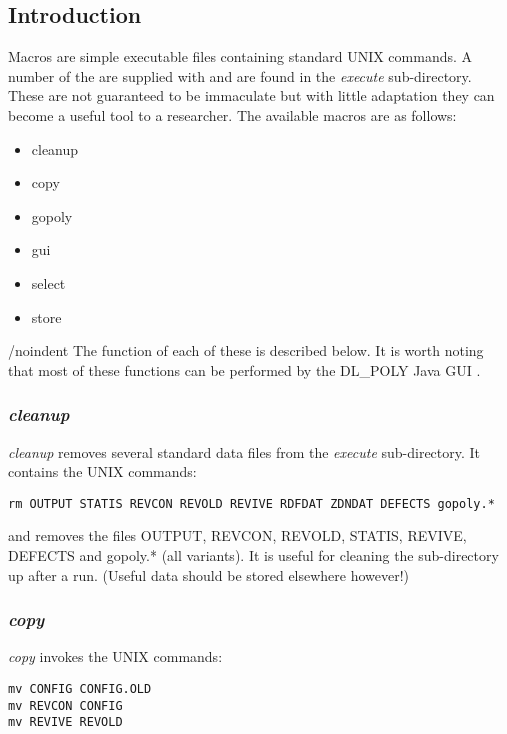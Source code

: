 \label{macros}
\subsection*{Introduction}

Macros are simple executable files containing standard UNIX
commands.  A number of the are supplied with \D and are found in
the {\em execute} sub-directory.  These are
not guaranteed to be immaculate but with little adaptation they
can become a useful tool to a researcher.  The available macros
are as follows:

{\sl
\begin{itemize}
\item cleanup
\item copy
\item gopoly
\item gui
\item select
\item store
\end{itemize}
}

/noindent The function of each of these is described below. It is
worth noting that most of these functions can be performed by the
DL\_POLY Java GUI \cite{smith-gui}.

\subsubsection*{{\sl cleanup}}

{\sl cleanup} removes several standard data files from the {\em
execute} sub-directory.  It contains the UNIX
commands:
\begin{verbatim}
rm OUTPUT STATIS REVCON REVOLD REVIVE RDFDAT ZDNDAT DEFECTS gopoly.*
\end{verbatim}
\noindent and removes the files OUTPUT, REVCON, REVOLD, STATIS,
REVIVE, DEFECTS and gopoly.* (all variants).  It is useful for
cleaning the sub-directory up after a run.
(Useful data should be stored elsewhere however!)

\subsubsection*{{\sl copy}}

{\sl copy} invokes the UNIX commands:

\begin{verbatim}
mv CONFIG CONFIG.OLD
mv REVCON CONFIG
mv REVIVE REVOLD
\end{verbatim}

